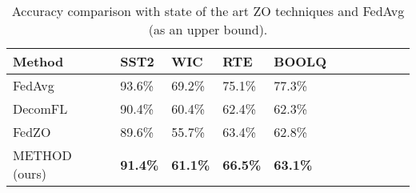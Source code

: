 \begin{table}[t!]
  \caption{Accuracy comparison with state of the art \ac{ZO} techniques and FedAvg (as an upper bound).}
  \label{table:accuracy_comparison}
  \centering
  \begin{adjustbox}{width=\columnwidth,center}
  \begin{tabular}{lllllllllll}
    \toprule
    Method           &     SST2         &  WIC       & RTE & BOOLQ  \\
    \midrule
    FedAvg           &  93.6\%        &  69.2\%        &  75.1\%        &  77.3\%  \\
    \midrule
    DecomFL    &  90.4\%        &  60.4\%        &  62.4\%        &  62.3\%  \\
    FedZO      &  89.6\%       &  55.7\%        &  63.4\%            &  62.8\%  \\
    \ac{METHOD} (ours)       &  \textbf{91.4\%}        &  \textbf{61.1\%}        &  \textbf{66.5\%}        &  \textbf{63.1\%}  \\
    
    
    \bottomrule
  \end{tabular}
  \end{adjustbox}
\end{table}
